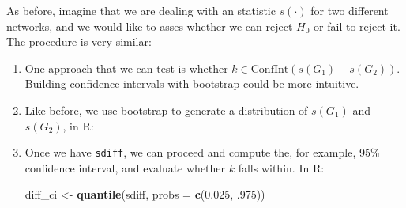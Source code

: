 \documentclass[]{book}
\newenvironment{Shaded}{\begin{snugshade}}{\end{snugshade}}
\newcommand{\CommentTok}[1]{\textcolor[rgb]{0.56,0.35,0.01}{\textit{#1}}}
\newcommand{\ControlFlowTok}[1]{\textcolor[rgb]{0.13,0.29,0.53}{\textbf{#1}}}
\newcommand{\DataTypeTok}[1]{\textcolor[rgb]{0.13,0.29,0.53}{#1}}
\newcommand{\DecValTok}[1]{\textcolor[rgb]{0.00,0.00,0.81}{#1}}
\newcommand{\FloatTok}[1]{\textcolor[rgb]{0.00,0.00,0.81}{#1}}
\newcommand{\KeywordTok}[1]{\textcolor[rgb]{0.13,0.29,0.53}{\textbf{#1}}}
\newcommand{\NormalTok}[1]{#1}
\newcommand{\OperatorTok}[1]{\textcolor[rgb]{0.81,0.36,0.00}{\textbf{#1}}}
\newcommand{\StringTok}[1]{\textcolor[rgb]{0.31,0.60,0.02}{#1}}
\begin{document}
As before, imagine that we are dealing with an statistic \(s(\cdot)\) for two
different networks, and we would like to asses whether we can reject \(H_0\)
or \href{https://www.thoughtco.com/fail-to-reject-in-a-hypothesis-test-3126424}{fail to reject} it.
The procedure is very similar:

\begin{enumerate}
\def\labelenumi{\arabic{enumi}.}
\item
  One approach that we can test is whether \(k \in \mbox{ConfInt}(s(G_1) - s(G_2))\).
  Building confidence intervals with bootstrap could be more intuitive.
\item
  Like before, we use bootstrap to generate a distribution of \(s(G_1)\) and
  \(s(G_2)\), in R:

\begin{Shaded}
\end{Shaded}
\item
  Once we have \texttt{sdiff}, we can proceed and compute the, for example, 95\%
  confidence interval, and evaluate whether \(k\) falls within. In R:

\begin{Shaded}
\begin{Highlighting}[]
\NormalTok{diff_ci <-}\StringTok{ }\KeywordTok{quantile}\NormalTok{(sdiff, }\DataTypeTok{probs =} \KeywordTok{c}\NormalTok{(}\FloatTok{0.025}\NormalTok{, }\FloatTok{.975}\NormalTok{))}
\end{Highlighting}
\end{Shaded}
\end{enumerate}
\end{document}
